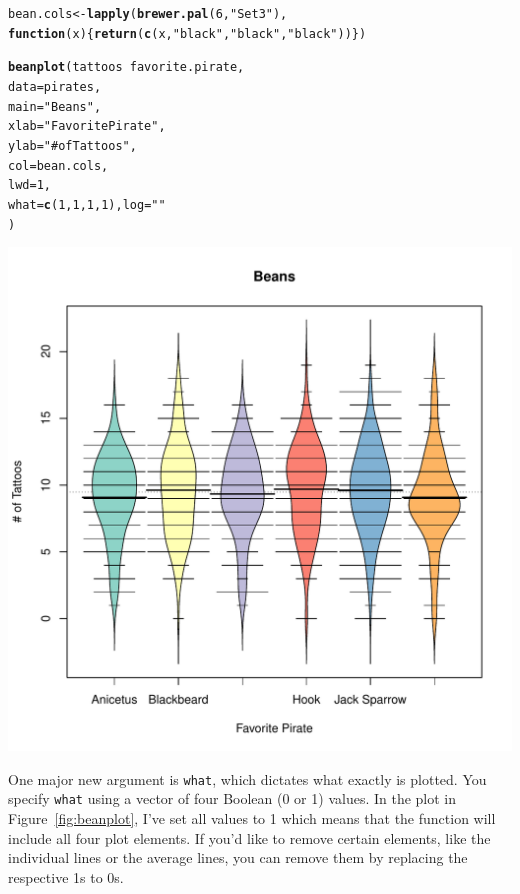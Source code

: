 \documentclass{tufte-book}\usepackage[]{graphicx}\usepackage[]{color}
\makeatletter
\def\maxwidth{ %
  \ifdim\Gin@nat@width>\linewidth
    \linewidth
  \else
    \Gin@nat@width
  \fi
}
\newcommand{\hlnum}[1]{\textcolor[rgb]{0.686,0.059,0.569}{#1}}%
\newcommand{\hlstr}[1]{\textcolor[rgb]{0.192,0.494,0.8}{#1}}%
\newcommand{\hlopt}[1]{\textcolor[rgb]{0,0,0}{#1}}%
\newcommand{\hlstd}[1]{\textcolor[rgb]{0.345,0.345,0.345}{#1}}%
\newcommand{\hlkwa}[1]{\textcolor[rgb]{0.161,0.373,0.58}{\textbf{#1}}}%
\newcommand{\hlkwb}[1]{\textcolor[rgb]{0.69,0.353,0.396}{#1}}%
\newcommand{\hlkwc}[1]{\textcolor[rgb]{0.333,0.667,0.333}{#1}}%
\newcommand{\hlkwd}[1]{\textcolor[rgb]{0.737,0.353,0.396}{\textbf{#1}}}%
\newenvironment{kframe}{%
 \def\at@end@of@kframe{}%
 \ifinner\ifhmode%
  \def\at@end@of@kframe{\end{minipage}}%
  \begin{minipage}{\columnwidth}%
 \fi\fi%
 \def\FrameCommand##1{\hskip\@totalleftmargin \hskip-\fboxsep
 \colorbox{shadecolor}{##1}\hskip-\fboxsep
     \hskip-\linewidth \hskip-\@totalleftmargin \hskip\columnwidth}%
 \MakeFramed {\advance\hsize-\width
   \@totalleftmargin\z@ \linewidth\hsize
   \@setminipage}}%
 {\par\unskip\endMakeFramed%
 \at@end@of@kframe}
\newenvironment{knitrout}{}{} %
\makeatother
\begin{document}
\begin{footnotesize}
\begin{footnotesize}
\begin{knitrout}
\begin{kframe}
\begin{alltt}
\hlstd{bean.cols} \hlkwb{<-} \hlkwd{lapply}\hlstd{(}\hlkwd{brewer.pal}\hlstd{(}\hlnum{6}\hlstd{,} \hlstr{"Set3"}\hlstd{),}
                    \hlkwa{function}\hlstd{(}\hlkwc{x}\hlstd{) \{}\hlkwd{return}\hlstd{(}\hlkwd{c}\hlstd{(x,} \hlstr{"black"}\hlstd{,} \hlstr{"black"}\hlstd{,} \hlstr{"black"}\hlstd{))\})}

\hlkwd{beanplot}\hlstd{(tattoos} \hlopt{~} \hlstd{favorite.pirate,}
         \hlkwc{data} \hlstd{= pirates,}
         \hlkwc{main} \hlstd{=} \hlstr{"Beans"}\hlstd{,}
         \hlkwc{xlab} \hlstd{=} \hlstr{"Favorite Pirate"}\hlstd{,}
         \hlkwc{ylab} \hlstd{=} \hlstr{"# of Tattoos"}\hlstd{,}
         \hlkwc{col} \hlstd{= bean.cols ,}
         \hlkwc{lwd} \hlstd{=} \hlnum{1}\hlstd{,}
         \hlkwc{what} \hlstd{=} \hlkwd{c}\hlstd{(}\hlnum{1}\hlstd{,} \hlnum{1}\hlstd{,} \hlnum{1}\hlstd{,} \hlnum{1}\hlstd{),} \hlkwc{log} \hlstd{=} \hlstr{""}
         \hlstd{)}
\end{alltt}
\end{kframe}
\includegraphics[width=\maxwidth]{figure/unnamed-chunk-152-1} 

\end{knitrout}
\end{footnotesize}

One major new argument is \texttt{what}, which dictates what exactly is plotted. You specify \texttt{what} using a vector of four Boolean (0 or 1) values. In the plot in Figure~\ref{fig:beanplot}, I've set all values to 1 which means that the function will include all four plot elements. If you'd like to remove certain elements, like the individual lines or the average lines, you can remove them by replacing the respective 1s to 0s.






\end{footnotesize}
\end{document}
